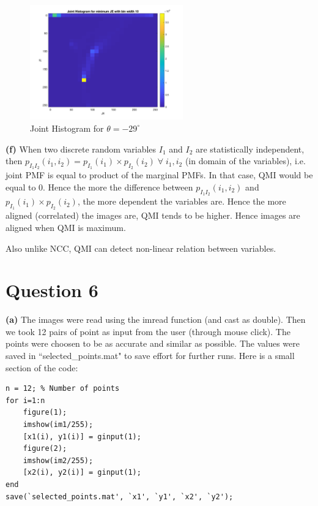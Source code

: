 \documentclass[12pt]{article}
\begin{document}
    \vspace{-13pt}
    
    \begin{figure}[H]
        \centering
        \includegraphics[width=0.59\textwidth]{Images/Q5/Joint_hist_JE.png}
        \vspace{-10pt}
        \caption{Joint Histogram for $\theta = -29^{\circ}$}
    \end{figure}
    
    \vspace{-10pt}

    \textbf{(f)} When two discrete random variables $I_1$ and $I_2$ are statistically independent, then $p_{I_1 I_2}(i_1,i_2)=p_{I_1}(i_1) \times p_{I_2}(i_2) \; \forall \; i_1, i_2$ (in domain of the variables), i.e. joint PMF is equal to product of the marginal PMFs. In that case, QMI would be equal to $0$. Hence the more the difference between $p_{I_1 I_2}(i_1,i_2)$ and $p_{I_1}(i_1) \times p_{I_2}(i_2)$, the more dependent the variables are. Hence the more aligned (correlated) the images are, QMI tends to be higher. Hence images are aligned when QMI is maximum.
    
    Also unlike NCC, QMI can detect non-linear relation between variables.
\section{Question 6}
\textbf{(a)} The images were read using the imread function (and cast as double). Then we took 12 pairs of point as input from the user (through mouse click). The points were choosen to be as accurate and similar as possible. The values were saved in ``selected\_points.mat" to save effort for further runs. Here is a small section of the code:
\begin{verbatim}
n = 12; % Number of points
for i=1:n
    figure(1); 
    imshow(im1/255); 
    [x1(i), y1(i)] = ginput(1);
    figure(2); 
    imshow(im2/255); 
    [x2(i), y2(i)] = ginput(1);
end
save(`selected_points.mat', `x1', `y1', `x2', `y2');
\end{verbatim}
\end{document}
